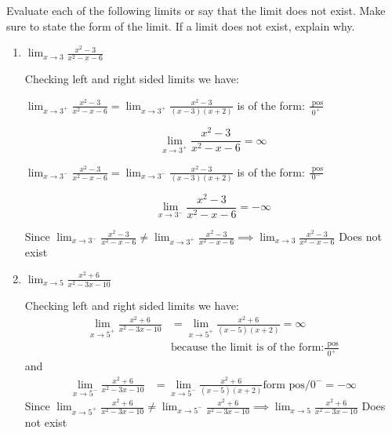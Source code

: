 \documentclass[nooutcomes]{ximera}
\begin{document}
\begin{problem}
  Evaluate each of the following limits or say that the limit does not exist. Make sure to state the form of the limit.
  If a limit does not exist, explain why.

  \begin{enumerate}
	\item
      $\displaystyle \lim_{x \to 3} \frac{x^2 - 3}{x^2 - x - 6}$
      \begin{freeResponse} Checking left and right sided limits we have:

          $\lim_{x \to 3^+} \frac{x^2 - 3}{x^2 - x - 6} = \lim_{x \to 3^+} \frac{x^2 - 3}{(x-3)(x+2)}$ is of the form:  $\frac{\text{ pos}}{0^+}$

	$$\lim_{x \to 3^+} \frac{x^2 - 3}{x^2 - x - 6} = \infty$$

         $ \lim_{x \to 3^-} \frac{x^2 - 3}{x^2 - x - 6} = \lim_{x \to 3^-} \frac{x^2 - 3}{(x-3)(x+2)}$  is of the form:  $\frac{\text{ pos}}{0^-}$

	$$\lim_{x \to 3^-} \frac{x^2 - 3}{x^2 - x - 6} =-\infty$$

	Since $\lim_{x \to 3^-} \frac{x^2 - 3}{x^2 - x - 6} \ne \lim_{x \to 3^+} \frac{x^2 - 3}{x^2 - x - 6}\implies \lim_{x \to 3} \frac{x^2 - 3}{x^2 - x - 6}$ Does not exist
      \end{freeResponse}

    \item
      $\displaystyle \lim_{x \to 5} \frac{x^2 + 6}{x^2 - 3x - 10}$
      \begin{freeResponse}
       Checking left and right sided limits we have:
        \begin{align*}
          \lim_{x \to 5^+} \frac{x^2 + 6}{x^2 - 3x - 10} &= \lim_{x \to 5^+} \frac{x^2 + 6}{(x-5)(x+2)}  = \infty \\
	&\text{because the limit is of the form:} \frac{\text{ pos}}{0^+}
        \end{align*}
        and
        \begin{align*}
          \lim_{x \to 5^-} \frac{x^2 + 6}{x^2 - 3x - 10} &= \lim_{x \to 5^-} \frac{x^2 + 6}{(x-5)(x+2)} \text{form $\text{pos}/0^-$} = -\infty
        \end{align*}
Since $ \lim_{x \to 5^+} \frac{x^2 + 6}{x^2 - 3x - 10}  \ne \lim_{x \to 5^-} \frac{x^2 + 6}{x^2 - 3x - 10}\implies \lim_{x \to 5} \frac{x^2 + 6}{x^2 - 3x - 10}$ Does not exist
      \end{freeResponse}


\end{enumerate}
\end{problem}
\end{document}
